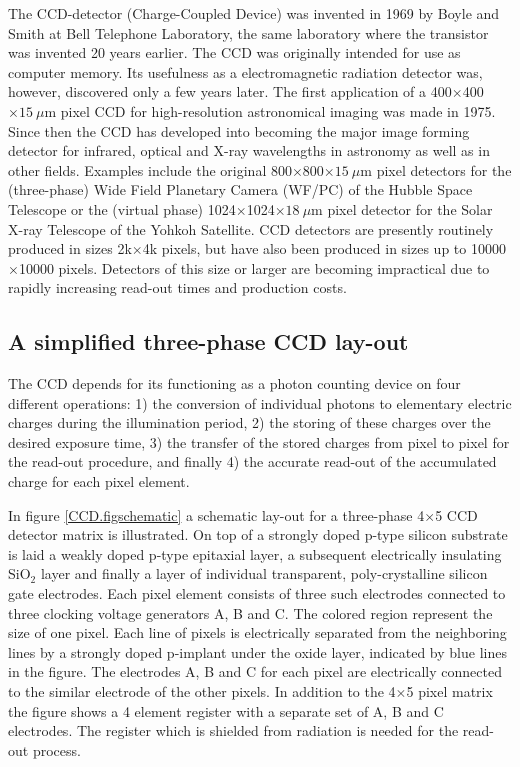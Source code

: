 \documentclass{article}
\begin{document}
The CCD-detector (Charge-Coupled Device) was invented in 1969 by Boyle
and Smith at Bell Telephone Laboratory, the same laboratory where the
transistor was invented 20 years earlier. The CCD was originally
intended for use as computer memory. Its usefulness as a
electromagnetic radiation detector was, however, discovered only a few
years later. The first application of a 400$\times$400$\times 15~\mu$m
pixel CCD for high-resolution astronomical imaging was made in
1975. Since then the CCD has developed into becoming the major image
forming detector for infrared, optical and X-ray wavelengths in
astronomy as well as in other fields.  Examples include the original
800$\times$800$\times 15~\mu$m pixel detectors for the (three-phase)
Wide Field Planetary Camera (WF/PC) of the Hubble Space Telescope or
the (virtual phase) 1024$\times$1024$\times 18~\mu$m pixel detector
for the Solar X-ray Telescope of the Yohkoh Satellite. CCD detectors
are presently routinely produced in sizes 2k$\times$4k pixels, but
have also been produced in sizes up to 10000$\times$10000
pixels. Detectors of this size or larger are becoming impractical due
to rapidly increasing read-out times and production costs.

\subsection*{A simplified three-phase CCD lay-out}

The CCD depends for its functioning as a photon counting device on
four different operations: 1) the conversion of individual photons to
elementary electric charges during the illumination period, 2) the
storing of these charges over the desired exposure time, 3) the
transfer of the stored charges from pixel to pixel for the read-out
procedure, and finally 4) the accurate read-out of the accumulated
charge for each pixel element.  

In figure \ref{CCD.figschematic} a schematic lay-out for a three-phase
4$\times $5 CCD detector matrix is illustrated.  On top of a strongly
doped p-type silicon substrate is laid a weakly doped p-type epitaxial
layer, a subsequent electrically insulating SiO$_2$ layer and finally
a layer of individual transparent, poly-crystalline silicon gate
electrodes.  Each pixel element consists of three such electrodes
connected to three clocking voltage generators A, B and C. The colored
region represent the size of one pixel. Each line of pixels is
electrically separated from the neighboring lines by a strongly doped
p-implant under the oxide layer, indicated by blue lines in the
figure. The electrodes A, B and C for each pixel are electrically
connected to the similar electrode of the other pixels. In addition to
the 4$\times$5 pixel matrix the figure shows a 4 element register with
a separate set of A, B and C electrodes. The register which is
shielded from radiation is needed for the read-out process.
\end{document}
